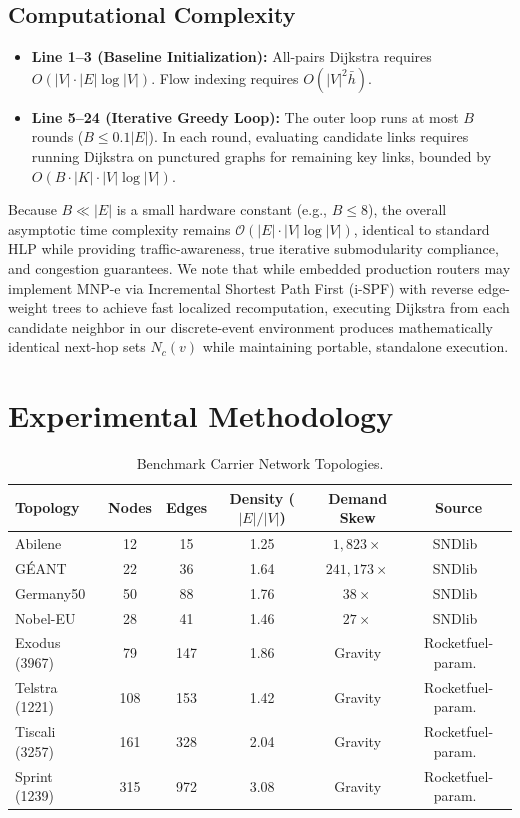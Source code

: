 \documentclass[journal]{IEEEtran}
\begin{document}
\subsection{Computational Complexity}
\begin{itemize}
    \item \textbf{Line 1--3 (Baseline Initialization):} All-pairs Dijkstra requires $O(|V| \cdot |E| \log |V|)$. Flow indexing requires $O(|V|^2 \bar{h})$.
    \item \textbf{Line 5--24 (Iterative Greedy Loop):} The outer loop runs at most $B$ rounds ($B \le 0.1|E|$). In each round, evaluating candidate links requires running Dijkstra on punctured graphs for remaining key links, bounded by $O(B \cdot |K| \cdot |V| \log |V|)$.
\end{itemize}
Because $B \ll |E|$ is a small hardware constant (e.g., $B \le 8$), the overall asymptotic time complexity remains $\mathcal{O}(|E| \cdot |V| \log |V|)$, identical to standard HLP while providing traffic-awareness, true iterative submodularity compliance, and congestion guarantees. We note that while embedded production routers may implement MNP-e via Incremental Shortest Path First (i-SPF) with reverse edge-weight trees to achieve fast localized recomputation, executing Dijkstra from each candidate neighbor in our discrete-event environment produces mathematically identical next-hop sets $N_c(v)$ while maintaining portable, standalone execution.


\section{Experimental Methodology}

\begin{table}[t]
\centering
\caption{Benchmark Carrier Network Topologies.}
\label{tab:topos}
\begin{tabular}{@{}lccccc@{}}
\toprule
\textbf{Topology} & \textbf{Nodes} & \textbf{Edges} & \textbf{Density ($|E|/|V|$)} & \textbf{Demand Skew} & \textbf{Source} \\ \midrule
Abilene & 12 & 15 & 1.25 & $1,823\times$ & SNDlib~\cite{orlowski2010sndlib} \\
G{\'E}ANT & 22 & 36 & 1.64 & $241,173\times$ & SNDlib~\cite{orlowski2010sndlib} \\
Germany50 & 50 & 88 & 1.76 & $38\times$ & SNDlib~\cite{orlowski2010sndlib} \\
Nobel-EU & 28 & 41 & 1.46 & $27\times$ & SNDlib~\cite{orlowski2010sndlib} \\
Exodus (3967) & 79 & 147 & 1.86 & Gravity & Rocketfuel-param.~\cite{spring2002measuring,geng2020hybrid} \\
Telstra (1221) & 108 & 153 & 1.42 & Gravity & Rocketfuel-param.~\cite{spring2002measuring,geng2020hybrid} \\
Tiscali (3257) & 161 & 328 & 2.04 & Gravity & Rocketfuel-param.~\cite{spring2002measuring,geng2020hybrid} \\
Sprint (1239) & 315 & 972 & 3.08 & Gravity & Rocketfuel-param.~\cite{spring2002measuring,geng2020hybrid} \\ \bottomrule
\end{tabular}
\end{table}
\end{document}
